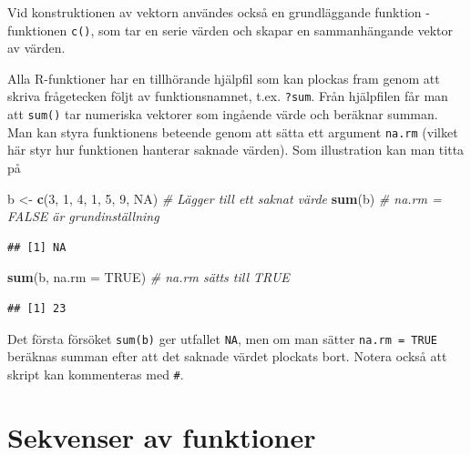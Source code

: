 \documentclass[
]{book}
\newenvironment{Shaded}{\begin{snugshade}}{\end{snugshade}}
\newcommand{\AttributeTok}[1]{\textcolor[rgb]{0.13,0.29,0.53}{#1}}
\newcommand{\CommentTok}[1]{\textcolor[rgb]{0.56,0.35,0.01}{\textit{#1}}}
\newcommand{\ConstantTok}[1]{\textcolor[rgb]{0.56,0.35,0.01}{#1}}
\newcommand{\DecValTok}[1]{\textcolor[rgb]{0.00,0.00,0.81}{#1}}
\newcommand{\FunctionTok}[1]{\textcolor[rgb]{0.13,0.29,0.53}{\textbf{#1}}}
\newcommand{\NormalTok}[1]{#1}
\newcommand{\OtherTok}[1]{\textcolor[rgb]{0.56,0.35,0.01}{#1}}
\theoremstyle{definition}
\theoremstyle{definition}
\theoremstyle{definition}
\theoremstyle{definition}
\theoremstyle{remark}
\begin{document}
Vid konstruktionen av vektorn användes också en grundläggande funktion - funktionen \texttt{c()}, som tar en serie värden och skapar en sammanhängande vektor av värden.

Alla R-funktioner har en tillhörande hjälpfil som kan plockas fram genom att skriva frågetecken följt av funktionsnamnet, t.ex. \texttt{?sum}. Från hjälpfilen får man att \texttt{sum()} tar numeriska vektorer som ingående värde och beräknar summan. Man kan styra funktionens beteende genom att sätta ett argument \texttt{na.rm} (vilket här styr hur funktionen hanterar saknade värden). Som illustration kan man titta på

\begin{Shaded}
\begin{Highlighting}[]
\NormalTok{b }\OtherTok{\textless{}{-}} \FunctionTok{c}\NormalTok{(}\DecValTok{3}\NormalTok{, }\DecValTok{1}\NormalTok{, }\DecValTok{4}\NormalTok{, }\DecValTok{1}\NormalTok{, }\DecValTok{5}\NormalTok{, }\DecValTok{9}\NormalTok{, }\ConstantTok{NA}\NormalTok{)  }\CommentTok{\# Lägger till ett saknat värde}
\FunctionTok{sum}\NormalTok{(b)                        }\CommentTok{\# na.rm = FALSE är grundinställning}
\end{Highlighting}
\end{Shaded}

\begin{verbatim}
## [1] NA
\end{verbatim}

\begin{Shaded}
\begin{Highlighting}[]
\FunctionTok{sum}\NormalTok{(b, }\AttributeTok{na.rm =} \ConstantTok{TRUE}\NormalTok{)          }\CommentTok{\# na.rm sätts till TRUE}
\end{Highlighting}
\end{Shaded}

\begin{verbatim}
## [1] 23
\end{verbatim}

Det första försöket \texttt{sum(b)} ger utfallet \texttt{NA}, men om man sätter \texttt{na.rm\ =\ TRUE} beräknas summan efter att det saknade värdet plockats bort. Notera också att skript kan kommenteras med \texttt{\#}.

\section{Sekvenser av funktioner}\label{sekvenser-av-funktioner}
\end{document}

